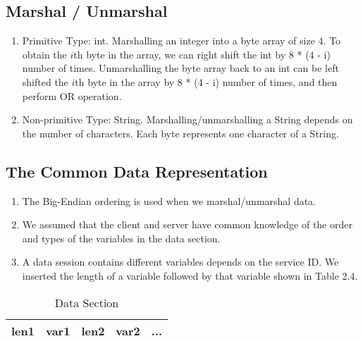 \begin{spacing}{1}
\subsection{Marshal / Unmarshal}
\begin{enumerate}
    \item Primitive Type: int.
Marshalling an integer into a byte array of size 4. To obtain the $i$th byte in the array, we can right shift the int by 8 * (4 - i) number of times.
		Unmarshalling the byte array back to an int can be left shifted the $i$th byte in the array  by 8 * (4 - i) number of times, and then perform OR  operation.
    \item Non-primitive Type: String.
Marshalling/unmarshalling a String depends on the number of characters. Each byte represents one character of a String.
\end{enumerate}

\subsection{The Common Data Representation}
\begin{enumerate}
    \item The Big-Endian ordering is used when we marshal/unmarshal data.
    \item We assumed that the client and server have common knowledge of the order and types of the variables in the data section.
    \item A data session contains different variables depends on the service ID.  We inserted the length of a variable followed by that variable shown in Table 2.4.
\end{enumerate}
\begin{table}[h!]
\centering
\begin{tabular}{|l|l|l|l|l|}
\hline
len1 & var1 & len2 & var2 & ... \\ \hline
\end{tabular}
\caption{Data Section}
\end{table}

\end{spacing}

